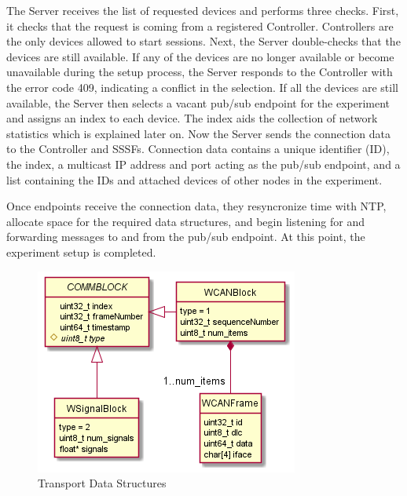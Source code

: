 \documentclass[letterpaper,twocolumn,12pt]{article}
\begin{document}
The Server receives the list of requested devices and performs three checks. First, it checks that the request is coming from a registered Controller. Controllers are the only devices allowed to start sessions. Next, the Server double-checks that the devices are still available. If any of the devices are no longer available or become unavailable during the setup process, the Server responds to the Controller with the error code 409, indicating a conflict in the selection. If all the devices are still available, the Server then selects a vacant pub/sub endpoint for the experiment and assigns an index to each device. The index aids the collection of network statistics which is explained later on. Now the Server sends the connection data to the Controller and SSSFs. Connection data contains a unique identifier (ID), the index, a multicast IP address and port acting as the pub/sub endpoint, and a list containing the IDs and attached devices of other nodes in the experiment.

Once endpoints receive the connection data, they resyncronize time with NTP, allocate space for the required data structures, and begin listening for and forwarding messages to and from the pub/sub endpoint. At this point, the experiment setup is completed.

\begin{figure}[]
    \centering
    \includegraphics[width=\linewidth]{out/images/data_structures/data_structures.png}
    \caption{Transport Data Structures}
    \label{fig:ds}
\end{figure}
\end{document}
